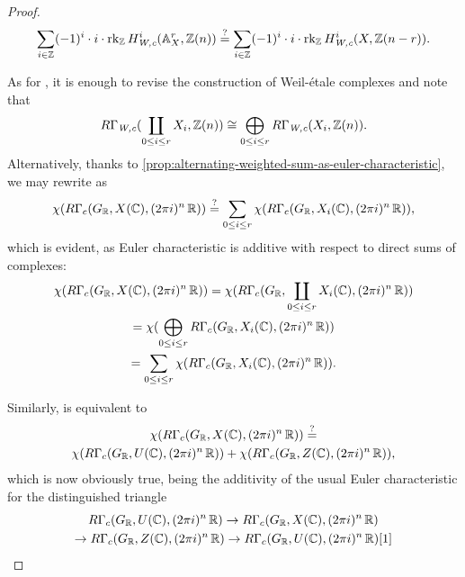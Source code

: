 \begin{theorem}
\begin{proof}
    \begin{equation}
      \label{eqn:vanishing-order-identity-for-affine-space}
      \sum_{i\in\mathbb{Z}} (-1)^i \cdot i \cdot \operatorname{rk}_{\mathbb{Z}} H^i_\text{\it W,c} (\mathbb{A}_X^r, \mathbb{Z} (n)) \stackrel{?}{=}
      \sum_{i\in\mathbb{Z}} (-1)^i \cdot i \cdot \operatorname{rk}_{\mathbb{Z}} H^i_\text{\it W,c} (X, \mathbb{Z} (n-r)).
    \end{equation}

    As for , it is
    enough to revise the construction of Weil-étale complexes and note that
    \[ R\Gamma_\text{\it W,c} (\coprod_{0 \le i \le r} X_i, \mathbb{Z} (n)) \cong
      \bigoplus_{0 \le i \le r} R\Gamma_\text{\it W,c} (X_i, \mathbb{Z} (n)). \]
    Alternatively, thanks to
    \ref{prop:alternating-weighted-sum-as-euler-characteristic}, we may rewrite
     as
    \[ \chi (R\Gamma_c (G_{\mathbb{R}}, X (\mathbb{C}), (2\pi i)^n\,\mathbb{R})) \stackrel{?}{=}
      \sum_{0 \le i \le r} \chi (R\Gamma_c (G_{\mathbb{R}}, X_i (\mathbb{C}), (2\pi i)^n\,\mathbb{R})), \]
    which is evident, as Euler characteristic is additive with respect to direct
    sums of complexes:
    \begin{multline*}
      \chi (R\Gamma_c (G_{\mathbb{R}}, X (\mathbb{C}), (2\pi i)^n\,\mathbb{R})) =
      \chi (R\Gamma_c (G_{\mathbb{R}}, \coprod_{0 \le i \le r} X_i (\mathbb{C}), (2\pi i)^n\,\mathbb{R})) \\
      = \chi (\bigoplus_{0 \le i \le r} R\Gamma_c (G_{\mathbb{R}}, X_i (\mathbb{C}), (2\pi i)^n\,\mathbb{R})) \\
      = \sum_{0 \le i \le r} \chi (R\Gamma_c (G_{\mathbb{R}}, X_i (\mathbb{C}), (2\pi i)^n\,\mathbb{R})).
    \end{multline*}

    Similarly,
     is
    equivalent to
    \begin{multline*}
      \chi (R\Gamma_c (G_{\mathbb{R}}, X (\mathbb{C}), (2\pi i)^n\,\mathbb{R})) \stackrel{?}{=} \\
      \chi (R\Gamma_c (G_{\mathbb{R}}, U (\mathbb{C}), (2\pi i)^n\,\mathbb{R})) +
      \chi (R\Gamma_c (G_{\mathbb{R}}, Z (\mathbb{C}), (2\pi i)^n\,\mathbb{R})),
    \end{multline*}
    which is now obviously true, being the additivity of the usual Euler
    characteristic for the distinguished triangle
    \begin{multline*}
      R\Gamma_c (G_{\mathbb{R}}, U (\mathbb{C}), (2\pi i)^n\,\mathbb{R}) \to
      R\Gamma_c (G_{\mathbb{R}}, X (\mathbb{C}), (2\pi i)^n\,\mathbb{R}) \\
      \to R\Gamma_c (G_{\mathbb{R}}, Z (\mathbb{C}), (2\pi i)^n\,\mathbb{R}) \to
      R\Gamma_c (G_{\mathbb{R}}, U (\mathbb{C}), (2\pi i)^n\,\mathbb{R}) [1]
    \end{multline*}


\end{proof}
\end{theorem}
